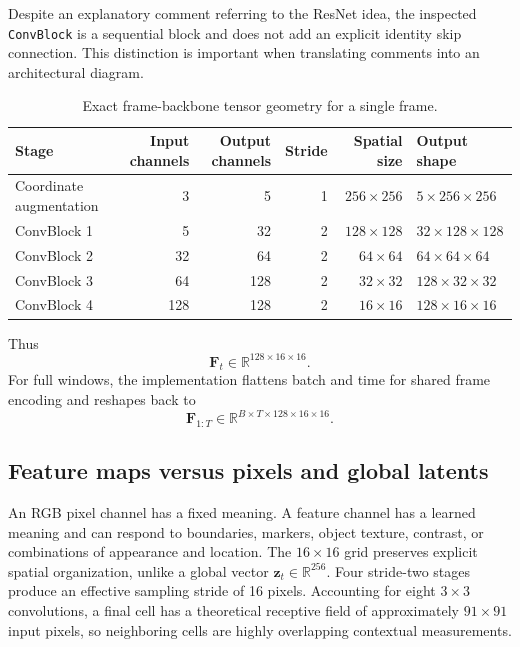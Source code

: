 \documentclass[11pt,a4paper]{article}
\newcommand{\R}{\mathbb{R}}\newcommand{\norm}[1]{\left\lVert #1\right\rVert}\newcommand{\E}{\mathbb{E}}\newcommand{\dt}{\Delta t}
\begin{document}
Despite an explanatory comment referring to the ResNet idea, the inspected \texttt{ConvBlock} is a sequential block and does not add an explicit identity skip connection. This distinction is important when translating comments into an architectural diagram.

\begin{table}[htbp]\centering
\caption{Exact frame-backbone tensor geometry for a single frame.}
\begin{tabular}{lrrrrl}\toprule
Stage & Input channels & Output channels & Stride & Spatial size & Output shape \\\midrule
Coordinate augmentation & 3 & 5 & 1 & $256\times256$ & $5\times256\times256$\\
ConvBlock 1 & 5 & 32 & 2 & $128\times128$ & $32\times128\times128$\\
ConvBlock 2 & 32 & 64 & 2 & $64\times64$ & $64\times64\times64$\\
ConvBlock 3 & 64 & 128 & 2 & $32\times32$ & $128\times32\times32$\\
ConvBlock 4 & 128 & 128 & 2 & $16\times16$ & $128\times16\times16$\\\bottomrule
\end{tabular}
\end{table}
Thus
\begin{equation}
\boxed{\bm F_t\in\R^{128\times16\times16}}.
\end{equation}
For full windows, the implementation flattens batch and time for shared frame encoding and reshapes back to
\begin{equation}
\bm F_{1:T}\in\R^{B\times T\times128\times16\times16}.
\end{equation}

\subsection{Feature maps versus pixels and global latents}
An RGB pixel channel has a fixed meaning. A feature channel has a learned meaning and can respond to boundaries, markers, object texture, contrast, or combinations of appearance and location. The $16\times16$ grid preserves explicit spatial organization, unlike a global vector $\bm z_t\in\R^{256}$. Four stride-two stages produce an effective sampling stride of 16 pixels. Accounting for eight $3\times3$ convolutions, a final cell has a theoretical receptive field of approximately $91\times91$ input pixels, so neighboring cells are highly overlapping contextual measurements.
\end{document}

